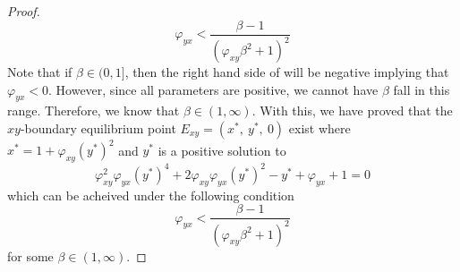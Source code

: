 \begin{proof}
    \begin{equation}\label{eq:xy-eq-condition}
        \varphi_{yx}<\frac{\beta-1}{\left(\varphi_{xy}\beta^2+1\right)^2}
    \end{equation}
    Note that if $\beta\in(0, 1]$, then the right hand side of  will be negative implying that $\varphi_{yx}<0$. However, since all parameters are positive, we cannot have $\beta$ fall in this range. Therefore, we know that $\beta\in\left(1,\infty\right)$. With this, we have proved that the $xy$-boundary equilibrium point $E_{xy}=\left(x^*,\ y^*,\ 0\right)$ exist where $x^*=1+\varphi_{xy}\left(y^*\right)^2$ and $y^*$ is a positive solution to
    \begin{equation*}
        \varphi_{xy}^2\varphi_{yx}\left(y^*\right)^4+2\varphi_{xy}\varphi_{yx}\left(y^*\right)^2-y^*+\varphi_{yx}+1=0
    \end{equation*}
    which can be acheived under the following condition
    \begin{equation*}
        \varphi_{yx}<\frac{\beta-1}{\left(\varphi_{xy}\beta^2+1\right)^2}
    \end{equation*}
    for some $\beta\in\left(1, \infty\right)$.
\end{proof}

